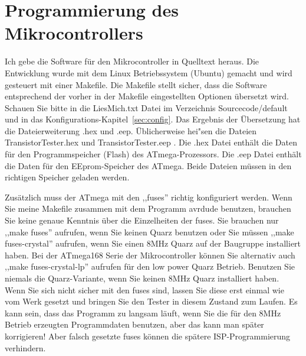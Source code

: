 \section{Programmierung des Mikrocontrollers}
Ich gebe die Software f\"ur den Mikrocontroller in Quelltext heraus.
Die Entwicklung wurde mit dem Linux Betriebssystem (Ubuntu) gemacht
und wird gesteuert mit einer Makefile.
Die Makefile stellt sicher, dass die Software entsprechend der vorher in der Makefile 
eingestellten Optionen \"ubersetzt wird. Schauen Sie bitte in die LiesMich.txt Datei
im Verzeichnis Sourcecode/default und in das Konfigurations-Kapitel~\ref{sec:config}.
Das Ergebnis der \"Ubersetzung hat die Dateierweiterung .hex und .eep.
\"Ublicherweise hei"sen die Dateien TransistorTester.hex und TransistorTester.eep .
Die .hex Datei enth\"alt die Daten f\"ur den Programmspeicher (Flash) des ATmega-Prozessors.
Die .eep Datei enth\"alt die Daten f\"ur den EEprom-Speicher des ATmega.
Beide Dateien m\"ussen in den richtigen Speicher geladen werden.

Zus\"atzlich muss der ATmega mit den ,,fuses'' richtig konfiguriert werden.
Wenn Sie meine Makefile zusammen mit dem Programm avrdude benutzen, brauchen Sie
keine genaue Kenntnis \"uber die Einzelheiten der fuses.
Sie brauchen nur ,,make fuses'' aufrufen, wenn Sie keinen Quarz benutzen oder Sie
m\"ussen ,,make fuses-crystal'' aufrufen, wenn Sie einen 8MHz Quarz auf der Baugruppe installiert haben.
Bei der ATmega168 Serie der Mikrocontroller k\"onnen Sie alternativ auch
,,make fuses-crystal-lp'' aufrufen f\"ur den low power Quarz Betrieb.
Benutzen Sie niemals die Quarz-Variante, wenn Sie keinen 8MHz Quarz installiert haben.
Wenn Sie sich nicht sicher mit den fuses sind, lassen Sie diese erst einmal wie
vom Werk gesetzt und bringen Sie den Tester in diesem Zustand zum Laufen.
Es kann sein, dass das Programm zu langsam l\"auft, wenn Sie die f\"ur den 8MHz Betrieb 
erzeugten Programmdaten benutzen, aber das kann man sp\"ater korrigieren!
Aber falsch gesetzte fuses k\"onnen die sp\"atere ISP-Programmierung verhindern.

